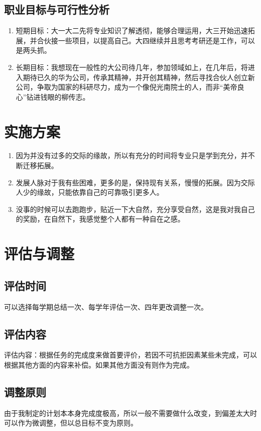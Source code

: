 \documentclass{article}
\begin{document}
\subsection{职业目标与可行性分析}
\begin{enumerate}[(1)]
	\item 短期目标：大一大二先将专业知识了解透彻，能够合理运用，大三开始迅速拓展，并合伙接一些项目，以提高自己。大四继续并且思考考研还是工作，可以是两头抓。\par
	\item 长期目标：我想现在一般性的大公司待几年，参加领域如上，在几年后，将进入期待已久的华为公司，传承其精神，并开创其精神，然后寻找合伙人创立新公司，争取为国家的科研尽力，成为一个像倪光南院士的人，而非“美帝良心”钻进钱眼的柳传志。\par
\end{enumerate}

\section{实施方案}
\begin{enumerate}[(1)]
	\item 因为并没有过多的交际的缘故，所以有充分的时间将专业只是学到充分，并不断迁移拓展。\par
	\item 发展人脉对于我有些困难，更多的是，保持现有关系，慢慢的拓展。因为交际人少的缘故，只能依靠自己的可靠吸引更多人。\par
	\item 没事的时候可以去跑跑步，贴近一下大自然，充分享受自然，这是我对我自己的奖励，在自然下，我感觉整个人都有一种自在之感。\par 
\end{enumerate}

\section{评估与调整}
\subsection{评估时间}
可以选择每学期总结一次、每学年评估一次、四年更改调整一次。\par
\subsection{评估内容}
评估内容：根据任务的完成度来做首要评价，若因不可抗拒因素某些未完成，可以根据其他方面的内容来补偿。如果其他方面没有则作为完成。\par
\subsection{调整原则}
由于我制定的计划本本身完成度极高，所以一般不需要做什么改变，到偏差太大时可以作为微调整，但以总目标不变为原则。\par
\end{document}
